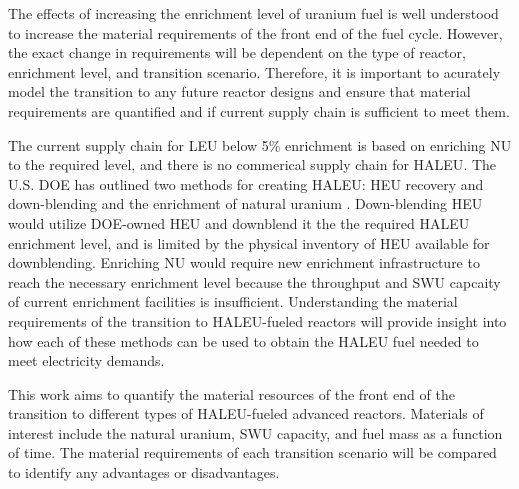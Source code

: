 The effects of increasing the enrichment level of uranium fuel is well 
understood to increase the material requirements of the front end of 
the fuel cycle. However, the exact change in requirements will be dependent 
on the type of reactor, enrichment level, and transition scenario.
Therefore, it is important to acurately model the transition to any future
reactor designs and ensure that material requirements are quantified and
if current supply chain is sufficient to meet them. 

The current supply chain for \gls{LEU} below 5\% enrichment is based on 
enriching \gls{NU} to the required level, and there is no commerical 
supply chain for \gls{HALEU}. The U.S. \gls{DOE} has outlined 
two methods for creating \gls{HALEU}: \gls{HEU} recovery and down-blending 
and the enrichment of natural uranium \cite{griffith_overview_2020}. 
Down-blending \gls{HEU} would utilize \gls{DOE}-owned \gls{HEU} and 
downblend it the the required \gls{HALEU} enrichment level, and is 
limited by the physical inventory of \gls{HEU} available for downblending. 
Enriching \gls{NU} would require new enrichment infrastructure to 
reach the necessary enrichment level because the throughput and \gls{SWU} 
capcaity of current enrichment facilities is insufficient. Understanding the 
material requirements of the transition to \gls{HALEU}-fueled 
reactors will provide insight into how each of these methods can be used 
to obtain the \gls{HALEU} fuel needed to meet electricity demands.

This work aims to quantify the material resources of the front end of the 
transition to different types of \gls{HALEU}-fueled advanced reactors. 
Materials of interest include the natural uranium, \gls{SWU} capacity, and 
fuel mass as a function of time. The material requirements of each transition 
scenario will be compared to identify any advantages or disadvantages. 